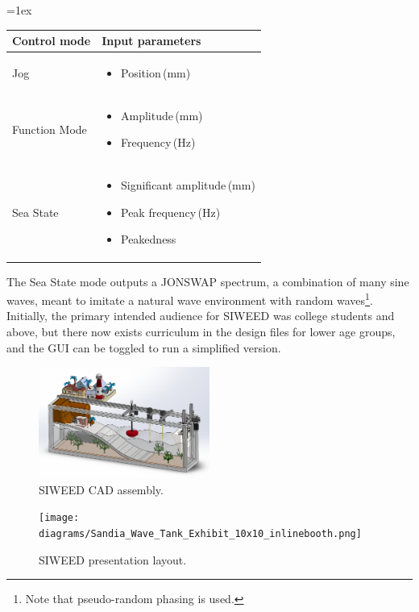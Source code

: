 \documentclass[11pt, letterpaper]{article}
\begin{document}
\tabulinesep=1ex
\begin{tabu} to \linewidth {|X|X|}
\hline
\textbf{Control mode} & \textbf{Input parameters} \\\hline
Jog & 
\begin{itemize}
\item{Position\,(mm)}
\end{itemize}
  \\\hline
Function Mode & 
\begin{itemize}
\item{Amplitude\,(mm)}
\item{Frequency\,(Hz)}
\end{itemize}
\\\hline
Sea State & 
\begin{itemize}
\item{Significant amplitude\,(mm)}
\item{Peak frequency\,(Hz)}
\item{Peakedness}
\end{itemize}
 \\\hline
\end{tabu}

The Sea State mode outputs a JONSWAP spectrum, a combination of many sine waves, meant to imitate a natural wave environment with random waves\footnote{Note that pseudo-random phasing is used.}.
Initially, the primary intended audience for SIWEED was college students and above, but there now exists curriculum in the design files for lower age groups, and the GUI can be toggled to run a simplified version.

\begin{figure}[tb]
  \centering
  \includegraphics[width=0.5\textwidth]{diagrams/SIWEED_CAD.png}
  \caption{SIWEED CAD assembly.}
  \label{fig:CAD}
\end{figure}
\begin{figure}[tb]
  \centering
  \texttt{[image: diagrams/Sandia\_Wave\_Tank\_Exhibit\_10x10\_inlinebooth.png]}
  \caption{SIWEED presentation layout.}
  \label{fig:Exhibit}
\end{figure}
\end{document}
